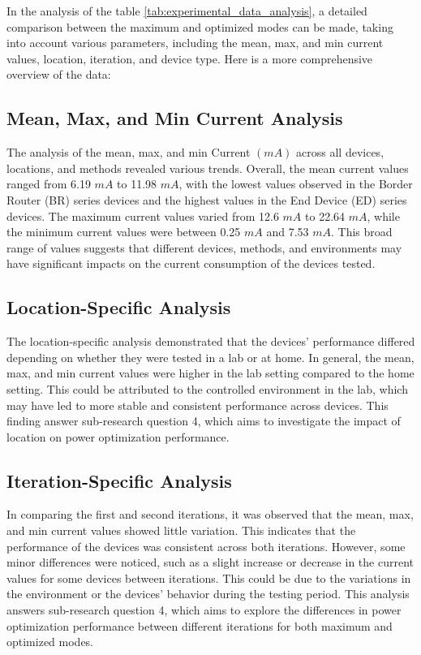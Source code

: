 In the analysis of the table \ref{tab:experimental_data_analysis}, a detailed comparison between the maximum and optimized modes can be made, taking into account various parameters, including the mean, max, and min current values, location, iteration, and device type. Here is a more comprehensive overview of the data:


\subsection{Mean, Max, and Min Current Analysis}

The analysis of the mean, max, and min Current $(mA)$ across all devices, locations, and methods revealed various trends. Overall, the mean current values ranged from 6.19 $mA$ to 11.98 $mA$, with the lowest values observed in the Border Router (BR) series devices and the highest values in the End Device (ED) series devices. The maximum current values varied from 12.6 $mA$ to 22.64 $mA$, while the minimum current values were between 0.25 $mA$ and 7.53 $mA$. This broad range of values suggests that different devices, methods, and environments may have significant impacts on the current consumption of the devices tested.


\subsection{Location-Specific Analysis}

The location-specific analysis demonstrated that the devices' performance differed depending on whether they were tested in a lab or at home. In general, the mean, max, and min current values were higher in the lab setting compared to the home setting. This could be attributed to the controlled environment in the lab, which may have led to more stable and consistent performance across devices. This finding answer sub-research question 4, which aims to investigate the impact of location on power optimization performance.


\subsection{Iteration-Specific Analysis}

In comparing the first and second iterations, it was observed that the mean, max, and min current values showed little variation. This indicates that the performance of the devices was consistent across both iterations. However, some minor differences were noticed, such as a slight increase or decrease in the current values for some devices between iterations. This could be due to the variations in the environment or the devices' behavior during the testing period. This analysis answers sub-research question 4, which aims to explore the differences in power optimization performance between different iterations for both maximum and optimized modes.


